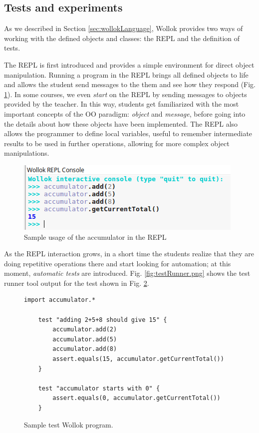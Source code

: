 \subsection{Tests and experiments}
As we described in Section \ref{sec:wollokLanguage}, Wollok provides two ways of working with the defined objects and classes: the REPL and the definition of tests.

The REPL is first introduced and provides a simple environment for direct object manipulation.
Running a program in the REPL brings all defined objects to life and allows the student send messages to the them and see how they respond (\cf Fig. \ref{fig:repl}).
In some courses, we even \emph{start} on the REPL by sending messages to objects provided by the teacher.
In this way, students get familiarized with the most important concepts of the OO paradigm: \emph{object} and \emph{message}, 
before going into the details about how these objects have been implemented.
The REPL also allows the programmer to define local variables, 
useful to remember intermediate results to be used in further operations, 
allowing for more complex object manipulations.

\begin{figure}[ht]
\vspace{-2mm}
 \centering
 \includegraphics[scale=0.55]{images/accumulator-repl.png}
\vspace{-3mm}
\caption{Sample usage of the accumulator in the REPL}
\label{fig:repl}
\vspace{-5mm}
\end{figure}

\medskip
As the REPL interaction grows, in a short time the students realize that they are doing repetitive operations there and start looking for automation;
at this moment, \emph{automatic tests} are introduced.
Fig. \ref{fig:testRunner.png} shows the test runner tool output for the test shown in Fig. \ref{fig:test}.

\begin{figure}[ht]
\vspace{-3mm}
\centering
\begin{lstlisting}[language=Wollok]
 	import accumulator.*

	test "adding 2+5+8 should give 15" {
		accumulator.add(2)
		accumulator.add(5)
		accumulator.add(8)
		assert.equals(15, accumulator.getCurrentTotal())		
	}
   
	test "accumulator starts with 0" {
		assert.equals(0, accumulator.getCurrentTotal())
	}\end{lstlisting}
\vspace{-3mm}
\caption{Sample test Wollok program.}
\label{fig:test}
\vspace{-3mm}
\end{figure}

